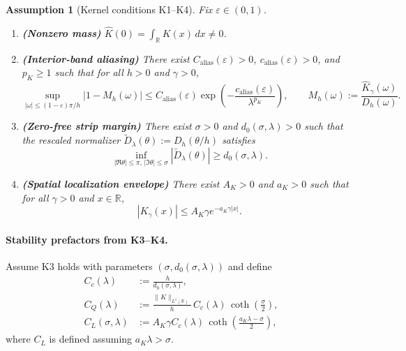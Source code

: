 \documentclass[11pt]{article}
\newtheorem{assumption}{Assumption}
\newcommand{\R}{\mathbb{R}}
\newcommand{\wh}[1]{\widehat{#1}}
\begin{document}
\begin{assumption}[Kernel conditions K1--K4]
Fix $\varepsilon\in(0,1)$.
\begin{enumerate}[label=K\arabic*.]
    \item \textbf{(Nonzero mass)} $\wh K(0)=\int_{\R}K(x)\,dx\ne 0$.
    \item \textbf{(Interior-band aliasing)} There exist $C_{\mathrm{alias}}(\varepsilon)>0$, $c_{\mathrm{alias}}(\varepsilon)>0$, and $p_K\ge 1$ such that for all $h>0$ and $\gamma>0$,
    \begin{equation}
    \sup_{|\omega|\le (1-\varepsilon)\pi/h}
    \bigl|1-M_h(\omega)\bigr|
    \le
    C_{\mathrm{alias}}(\varepsilon)\exp\!\left(-\frac{c_{\mathrm{alias}}(\varepsilon)}{\lambda^{p_K}}\right),
    \qquad
    M_h(\omega):=\frac{\wh K_\gamma(\omega)}{D_h(\omega)}.
    \label{eq:K2}
    \end{equation}
    \item \textbf{(Zero-free strip margin)} There exist $\sigma>0$ and $d_0(\sigma,\lambda)>0$ such that the rescaled normalizer $\widetilde D_\lambda(\theta):=D_h(\theta/h)$ satisfies
    \begin{equation}
    \inf_{|\Re\theta|\le \pi,\,|\Im\theta|\le \sigma}
    |\widetilde D_\lambda(\theta)|\ge d_0(\sigma,\lambda).
    \label{eq:K3}
    \end{equation}
    \item \textbf{(Spatial localization envelope)} There exist $A_K>0$ and $a_K>0$ such that for all $\gamma>0$ and $x\in\R$,
    \begin{equation}
    |K_\gamma(x)|\le A_K\gamma e^{-a_K\gamma |x|}.
    \label{eq:K4}
    \end{equation}
\end{enumerate}
\end{assumption}

\setcounter{lemma}{1}

\paragraph{Stability prefactors from K3--K4.}
Assume K3 holds with parameters $(\sigma,d_0(\sigma,\lambda))$ and define
\begin{align}
C_c(\lambda) &:= \frac{h}{d_0(\sigma,\lambda)}, \label{eq:Cc}\\
C_Q(\lambda) &:= \frac{\|K\|_{L^1(\R)}}{h}\, C_c(\lambda)\,\coth\!\left(\frac{\sigma}{2}\right), \label{eq:CQ}\\
C_L(\sigma,\lambda) &:= A_K\gamma C_c(\lambda)\,\coth\!\left(\frac{a_K\lambda-\sigma}{2}\right), \label{eq:CL}
\end{align}
where $C_L$ is defined assuming $a_K\lambda>\sigma$.
\end{document}
